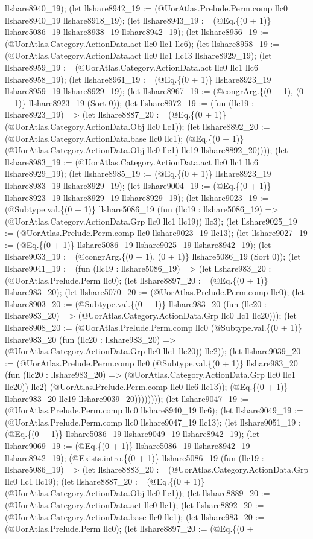 \documentclass[11pt]{article}
\begin{document}
llshare8940\_19); (let llshare8942\_19 := (@UorAtlas.Prelude.Perm.comp llc0 llshare8940\_19 llshare8918\_19); (let llshare8943\_19 := (@Eq.\{(0 + 1)\} llshare5086\_19 llshare8938\_19 llshare8942\_19); (let llshare8956\_19 := (@UorAtlas.Category.ActionData.act llc0 llc1 llc6); (let llshare8958\_19 := (@UorAtlas.Category.ActionData.act llc0 llc1 llc13 llshare8929\_19); (let llshare8959\_19 := (@UorAtlas.Category.ActionData.act llc0 llc1 llc6 llshare8958\_19); (let llshare8961\_19 := (@Eq.\{(0 + 1)\} llshare8923\_19 llshare8959\_19 llshare8929\_19); (let llshare8967\_19 := (@congrArg.\{(0 + 1), (0 + 1)\} llshare8923\_19 (Sort 0)); (let llshare8972\_19 := (fun (llc19 : llshare8923\_19) => (let llshare8887\_20 := (@Eq.\{(0 + 1)\} (@UorAtlas.Category.ActionData.Obj llc0 llc1)); (let llshare8892\_20 := (@UorAtlas.Category.ActionData.base llc0 llc1); (@Eq.\{(0 + 1)\} (@UorAtlas.Category.ActionData.Obj llc0 llc1) llc19 llshare8892\_20)))); (let llshare8983\_19 := (@UorAtlas.Category.ActionData.act llc0 llc1 llc6 llshare8929\_19); (let llshare8985\_19 := (@Eq.\{(0 + 1)\} llshare8923\_19 llshare8983\_19 llshare8929\_19); (let llshare9004\_19 := (@Eq.\{(0 + 1)\} llshare8923\_19 llshare8929\_19 llshare8929\_19); (let llshare9023\_19 := (@Subtype.val.\{(0 + 1)\} llshare5086\_19 (fun (llc19 : llshare5086\_19) => (@UorAtlas.Category.ActionData.Grp llc0 llc1 llc19)) llc3); (let llshare9025\_19 := (@UorAtlas.Prelude.Perm.comp llc0 llshare9023\_19 llc13); (let llshare9027\_19 := (@Eq.\{(0 + 1)\} llshare5086\_19 llshare9025\_19 llshare8942\_19); (let llshare9033\_19 := (@congrArg.\{(0 + 1), (0 + 1)\} llshare5086\_19 (Sort 0)); (let llshare9041\_19 := (fun (llc19 : llshare5086\_19) => (let llshare983\_20 := (@UorAtlas.Prelude.Perm llc0); (let llshare8897\_20 := (@Eq.\{(0 + 1)\} llshare983\_20); (let llshare5070\_20 := (@UorAtlas.Prelude.Perm.comp llc0); (let llshare8903\_20 := (@Subtype.val.\{(0 + 1)\} llshare983\_20 (fun (llc20 : llshare983\_20) => (@UorAtlas.Category.ActionData.Grp llc0 llc1 llc20))); (let llshare8908\_20 := (@UorAtlas.Prelude.Perm.comp llc0 (@Subtype.val.\{(0 + 1)\} llshare983\_20 (fun (llc20 : llshare983\_20) => (@UorAtlas.Category.ActionData.Grp llc0 llc1 llc20)) llc2)); (let llshare9039\_20 := (@UorAtlas.Prelude.Perm.comp llc0 (@Subtype.val.\{(0 + 1)\} llshare983\_20 (fun (llc20 : llshare983\_20) => (@UorAtlas.Category.ActionData.Grp llc0 llc1 llc20)) llc2) (@UorAtlas.Prelude.Perm.comp llc0 llc6 llc13)); (@Eq.\{(0 + 1)\} llshare983\_20 llc19 llshare9039\_20)))))))); (let llshare9047\_19 := (@UorAtlas.Prelude.Perm.comp llc0 llshare8940\_19 llc6); (let llshare9049\_19 := (@UorAtlas.Prelude.Perm.comp llc0 llshare9047\_19 llc13); (let llshare9051\_19 := (@Eq.\{(0 + 1)\} llshare5086\_19 llshare9049\_19 llshare8942\_19); (let llshare9069\_19 := (@Eq.\{(0 + 1)\} llshare5086\_19 llshare8942\_19 llshare8942\_19); (@Exists.intro.\{(0 + 1)\} llshare5086\_19 (fun (llc19 : llshare5086\_19) => (let llshare8883\_20 := (@UorAtlas.Category.ActionData.Grp llc0 llc1 llc19); (let llshare8887\_20 := (@Eq.\{(0 + 1)\} (@UorAtlas.Category.ActionData.Obj llc0 llc1)); (let llshare8889\_20 := (@UorAtlas.Category.ActionData.act llc0 llc1); (let llshare8892\_20 := (@UorAtlas.Category.ActionData.base llc0 llc1); (let llshare983\_20 := (@UorAtlas.Prelude.Perm llc0); (let llshare8897\_20 := (@Eq.\{(0 + 
\end{document}
